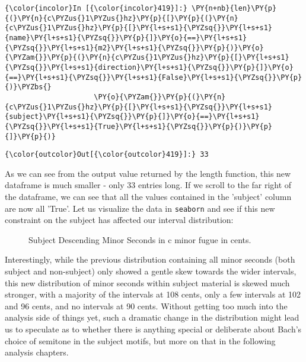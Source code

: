     \begin{Verbatim}[commandchars=\\\{\}]
{\color{incolor}In [{\color{incolor}419}]:} \PY{n+nb}{len}\PY{p}{(}\PY{n}{c\PYZus{}1\PYZus{}hz}\PY{p}{[}\PY{p}{(}\PY{n}{c\PYZus{}1\PYZus{}hz}\PY{p}{[}\PY{l+s+s1}{\PYZsq{}}\PY{l+s+s1}{name}\PY{l+s+s1}{\PYZsq{}}\PY{p}{]}\PY{o}{==}\PY{l+s+s1}{\PYZsq{}}\PY{l+s+s1}{m2}\PY{l+s+s1}{\PYZsq{}}\PY{p}{)}\PY{o}{\PYZam{}}\PY{p}{(}\PY{n}{c\PYZus{}1\PYZus{}hz}\PY{p}{[}\PY{l+s+s1}{\PYZsq{}}\PY{l+s+s1}{direction}\PY{l+s+s1}{\PYZsq{}}\PY{p}{]}\PY{o}{==}\PY{l+s+s1}{\PYZsq{}}\PY{l+s+s1}{False}\PY{l+s+s1}{\PYZsq{}}\PY{p}{)}\PYZbs{}
                     \PY{o}{\PYZam{}}\PY{p}{(}\PY{n}{c\PYZus{}1\PYZus{}hz}\PY{p}{[}\PY{l+s+s1}{\PYZsq{}}\PY{l+s+s1}{subject}\PY{l+s+s1}{\PYZsq{}}\PY{p}{]}\PY{o}{==}\PY{l+s+s1}{\PYZsq{}}\PY{l+s+s1}{True}\PY{l+s+s1}{\PYZsq{}}\PY{p}{)}\PY{p}{]}\PY{p}{)}
\end{Verbatim}
\begin{Verbatim}[commandchars=\\\{\}]
{\color{outcolor}Out[{\color{outcolor}419}]:} 33
\end{Verbatim}
    As we can see from the output value returned by the length function,
this new dataframe is much smaller - only 33 entries long. If we scroll
to the far right of the dataframe, we can see that all the values
contained in the 'subject' column are now all 'True'. Let us visualize
the data in \texttt{seaborn} and see if this new constraint on the
subject has affected our interval distribution:




\begin{figure}[H]
    \begin{center}
    \caption{ Subject Descending Minor Seconds in c minor fugue in cents. }
    \end{center}
\end{figure}
    
    Interestingly, while the previous distribution containing all minor
seconds (both subject and non-subject) only showed a gentle skew towards
the wider intervals, this new distribution of minor seconds within
subject material is skewed much stronger, with a majority of the
intervals at 108 cents, only a few intervals at 102 and 96 cents, and no
intervals at 90 cents. Without getting too much into the analysis side
of things yet, such a dramatic change in the distribution might lead us
to speculate as to whether there is anything special or deliberate about
Bach's choice of semitone in the subject motifs, but more on that in the
following analysis chapters.

